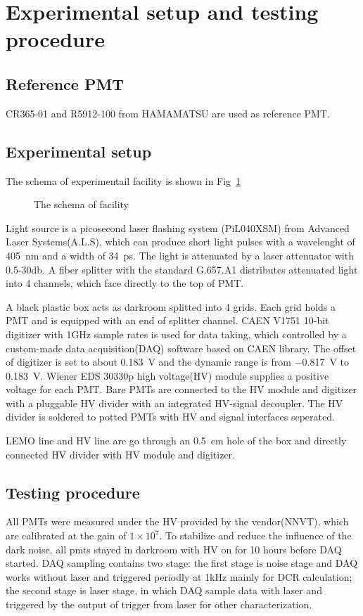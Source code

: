 \section{Experimental setup and testing procedure}
\label{SetUp}
\subsection{Reference PMT}
CR365-01\cite{BJBS} and R5912-100\cite{JPBS} from HAMAMATSU are used as reference PMT.
\subsection{Experimental setup}
The schema of experimentail facility is shown in Fig~\ref{fig:facility}
\begin{figure}
    \caption{The schema of facility}
    \label{fig:facility}
\end{figure}
Light source is a picosecond laser flashing system (PiL040XSM) from Advanced Laser Systems(A.L.S)\cite{NTKLaser}, which can produce short light pulses with a wavelenght of \SI{405}{nm} and a width of \SI{34}{ps}. The light is attenuated by a laser attenuator with 0.5-30db. A fiber splitter with the standard G.657.A1 distributes attenuated light into 4 channels, which face directly to the top of PMT.

A black plastic box acts as darkroom splitted into 4 grids. Each grid holds a PMT and is equipped with an end of splitter channel. CAEN V1751 10-bit digitizer with 1GHz sample rates is used for data taking\cite{CAENV1751}, which controlled by a custom-made data acquisition(DAQ) software based on CAEN library. The offset of digitizer is set to about \SI{0.183}{V} and the dynamic range is from \SI{-0.817}{V} to \SI{0.183}{V}. Wiener EDS 30330p high voltage(HV) module\cite{WIENERHV} supplies a positive voltage for each PMT. Bare PMTs are connected to the HV module and digitizer with a pluggable HV divider with an integrated HV-signal decoupler. The HV divider is soldered to potted PMTs with HV and signal interfaces seperated. 

LEMO line and HV line are go through an \SI{0.5}{cm} hole of the box and directly connected HV divider with HV module and digitizer. 

\subsection{Testing procedure}
All PMTs were measured under the HV provided by the vendor(NNVT), which are calibrated at the gain of $1\times10^7$. To stabilize and reduce the influence of the dark noise, all pmts stayed in darkroom  with HV on for 10 hours before DAQ started. DAQ sampling contains two stage: the first stage is noise stage and DAQ works without laser and triggered periodly at 1kHz mainly for DCR calculation; the second stage is laser stage, in which DAQ sample data with laser and triggered by the output of trigger from laser for other characterization.